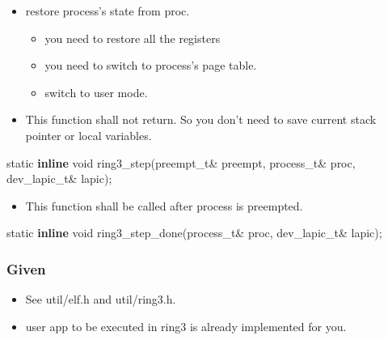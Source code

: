 \documentclass[]{book}
\newenvironment{Shaded}{}{}
\newcommand{\KeywordTok}[1]{\textbf{{#1}}}
\newcommand{\DataTypeTok}[1]{\textcolor[rgb]{0.50,0.00,0.00}{{#1}}}
\newcommand{\NormalTok}[1]{{#1}}
\begin{document}
\begin{itemize}
\itemsep1pt\parskip0pt
\item
  restore process's state from proc.

  \begin{itemize}
  \itemsep1pt\parskip0pt
  \item
    you need to restore all the registers
  \item
    you need to switch to process's page table.
  \item
    switch to user mode.
  \end{itemize}
\item
  This function shall not return. So you don't need to save current
  stack pointer or local variables.
\end{itemize}

\begin{Shaded}
\begin{Highlighting}[]
\DataTypeTok{static} \KeywordTok{inline} \DataTypeTok{void} \NormalTok{ring3_step(preempt_t& preempt, process_t& proc, dev_lapic_t& lapic);}
\end{Highlighting}
\end{Shaded}

\begin{itemize}
\itemsep1pt\parskip0pt
\item
  This function shall be called after process is preempted.
\end{itemize}

\begin{Shaded}
\begin{Highlighting}[]
\DataTypeTok{static} \KeywordTok{inline} \DataTypeTok{void} \NormalTok{ring3_step_done(process_t& proc, dev_lapic_t& lapic);}
\end{Highlighting}
\end{Shaded}

\subsubsection*{Given}\label{given-9}

\begin{itemize}
\itemsep1pt\parskip0pt
\item
  See util/elf.h and util/ring3.h.
\item
  user app to be executed in ring3 is already implemented for you.
\end{itemize}
\end{document}
